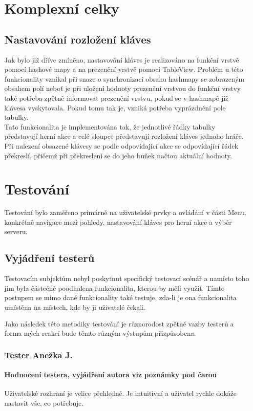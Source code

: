 \documentclass[12pt,a4paper]{article}
\let\oldsection\section
\renewcommand\section{\clearpage\oldsection}
\begin{document}
\section{Komplexní celky}
\subsection{Nastavování rozložení kláves}
Jak bylo již dříve zmíněno, nastavování kláves je realizováno na funkční vrstvě pomocí hashové mapy a na prezenční vrstvě pomocí TableView. Problém u této funkcionality vznikal při snaze o synchronizaci obsahu hashmapy se zobrazeným obsahem polí neboť je při uložení hodnoty prezenční vrstvou do funkční vrstvy také potřeba zpětně informovat prezenční vrstvu, pokud se v hashmapě již klávesa vyskytovala. Pokud tomu tak je, vzniká potřeba vyprázdnění pole tabulky. \\
Tato funkcionalita je implementována tak, že jednotlivé řádky tabulky představují herní akce a celé sloupce představují rozložení kláves jednoho hráče. Při nalezení obsazené klávesy se podle odpovídající akce se odpovídající řádek překreslí, přičemž při překreslení se do jeho buňek načtou aktuální hodnoty.

\section{Testování}
Testování bylo zaměřeno primárně na uživatelské prvky a ovládání v části Menu, konkrétně navigace mezi pohledy, nastavování kláves pro herní akce a výběr serveru.
\subsection{Vyjádření testerů}
Testovacím subjektům nebyl poskytnut specifický testovací scénář a namísto toho jim byla částečně poodhalena funkcionalita, kterou by měli využít. Tímto postupem se mimo dané funkcionality také testuje, zda-li je ona funkcionalita umístěna na místech, kde by ji uživatelé čekali.

Jako následek této metodiky testování je různorodost zpětné vazby testerů a forma mých reakcí bude těmto různým výstupům přizpůsobena.

\newpage
\subsubsection{Tester Anežka J.}
\paragraph{Hodnocení testera, vyjádření autora viz poznámky pod čarou\\}
Uživatelské rozhraní je velice přehledné. Je intuitivní a uživatel rychle dokáže nastavit vše, co potřebuje. 
\end{document}
